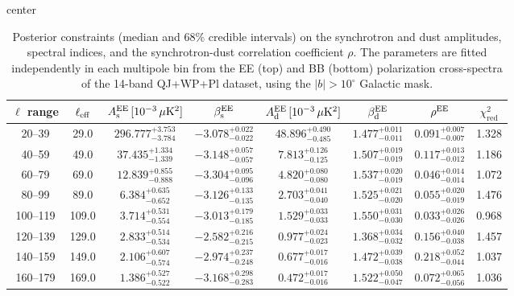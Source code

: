\begin{table}[h]
\centering
\setlength{\tabcolsep}{4pt}
\caption{Posterior constraints (median and $68\%$ credible intervals) on the synchrotron and dust amplitudes, spectral indices, and the synchrotron-dust correlation coefficient $\rho$. The parameters are fitted independently in each multipole bin from the EE (top) and BB (bottom) polarization cross-spectra of the 14-band QJ+WP+Pl dataset, using the $|b|>10^\circ$ Galactic mask.}
\label{tab:bin_to_bin_galcut10_cross_only}
\begin{adjustbox}{center}
\begin{tabular}{cccccccc}
\toprule
$\ell$ range & $\ell_{\rm eff}$ & $A^{\rm EE}_{\rm s}\,[10^{-3}\,\mu\mathrm{K}^2]$ & $\beta^{\rm EE}_{\rm s}$ & $A^{\rm EE}_{\rm d}\,[10^{-3}\,\mu\mathrm{K}^2]$ & $\beta^{\rm EE}_{\rm d}$ & $\rho^{\rm EE}$ & $\chi^2_\mathrm{red}$ \\
\midrule
20--39 & 29.0 & $296.777^{+3.753}_{-3.784}$ & $-3.078^{+0.022}_{-0.022}$ & $48.896^{+0.490}_{-0.485}$ & $1.477^{+0.011}_{-0.011}$ & $0.091^{+0.007}_{-0.007}$ & 1.328 \\
40--59 & 49.0 & $37.435^{+1.334}_{-1.339}$ & $-3.148^{+0.057}_{-0.057}$ & $7.813^{+0.126}_{-0.125}$ & $1.507^{+0.019}_{-0.019}$ & $0.117^{+0.013}_{-0.012}$ & 1.186 \\
60--79 & 69.0 & $12.839^{+0.855}_{-0.888}$ & $-3.304^{+0.095}_{-0.096}$ & $4.820^{+0.080}_{-0.080}$ & $1.537^{+0.020}_{-0.019}$ & $0.046^{+0.014}_{-0.014}$ & 1.072 \\
80--99 & 89.0 & $6.384^{+0.635}_{-0.652}$ & $-3.126^{+0.133}_{-0.135}$ & $2.703^{+0.041}_{-0.040}$ & $1.525^{+0.021}_{-0.020}$ & $0.055^{+0.020}_{-0.019}$ & 1.476 \\
100--119 & 109.0 & $3.714^{+0.531}_{-0.554}$ & $-3.013^{+0.179}_{-0.185}$ & $1.529^{+0.033}_{-0.033}$ & $1.550^{+0.031}_{-0.030}$ & $0.033^{+0.026}_{-0.026}$ & 0.968 \\
120--139 & 129.0 & $2.833^{+0.514}_{-0.534}$ & $-2.582^{+0.216}_{-0.215}$ & $0.977^{+0.024}_{-0.023}$ & $1.368^{+0.034}_{-0.032}$ & $0.156^{+0.040}_{-0.038}$ & 1.457 \\
140--159 & 149.0 & $2.106^{+0.607}_{-0.574}$ & $-2.974^{+0.237}_{-0.248}$ & $0.677^{+0.017}_{-0.016}$ & $1.472^{+0.039}_{-0.038}$ & $0.218^{+0.052}_{-0.044}$ & 1.037 \\
160--179 & 169.0 & $1.386^{+0.527}_{-0.522}$ & $-3.168^{+0.298}_{-0.283}$ & $0.472^{+0.017}_{-0.016}$ & $1.522^{+0.050}_{-0.047}$ & $0.072^{+0.065}_{-0.056}$ & 1.036 \\

\end{tabular}
\end{adjustbox}
\end{table}
